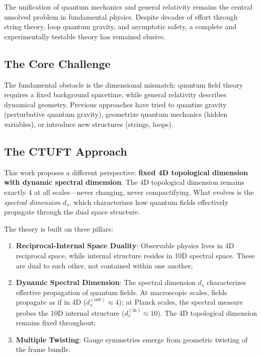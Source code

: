 \documentclass[aps,prd,reprint,superscriptaddress,amsmath,amssymb]{revtex4-2}
\begin{document}
The unification of quantum mechanics and general relativity remains the central unsolved problem in fundamental physics. Despite decades of effort through string theory, loop quantum gravity, and asymptotic safety, a complete and experimentally testable theory has remained elusive.

\subsection{The Core Challenge}

The fundamental obstacle is the dimensional mismatch: quantum field theory requires a fixed background spacetime, while general relativity describes dynamical geometry. Previous approaches have tried to quantize gravity (perturbative quantum gravity), geometrize quantum mechanics (hidden variables), or introduce new structures (strings, loops).

\subsection{The CTUFT Approach}

This work proposes a different perspective: \textbf{fixed 4D topological dimension with dynamic spectral dimension}. The 4D topological dimension remains exactly 4 at all scales---never changing, never compactifying. What evolves is the \textit{spectral dimension} $d_s$, which characterizes how quantum fields effectively propagate through the dual space structure.

The theory is built on three pillars:
\begin{enumerate}
    \item \textbf{Reciprocal-Internal Space Duality}: Observable physics lives in 4D reciprocal space, while internal structure resides in 10D spectral space. These are dual to each other, not contained within one another;
    \item \textbf{Dynamic Spectral Dimension}: The spectral dimension $d_s$ characterizes effective propagation of quantum fields. At macroscopic scales, fields propagate as if in 4D ($d_s^{(\text{out})} \approx 4$); at Planck scales, the spectral measure probes the 10D internal structure ($d_s^{(\text{in})} \approx 10$). The 4D topological dimension remains fixed throughout;
    \item \textbf{Multiple Twisting}: Gauge symmetries emerge from geometric twisting of the frame bundle.
\end{enumerate}
\end{document}
